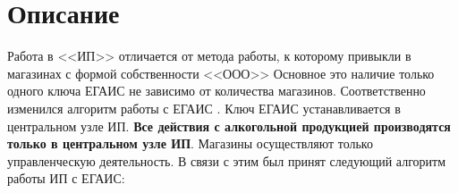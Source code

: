 \section{Описание}

Работа в <<ИП>> отличается от метода работы, к которому привыкли в магазинах с формой собственности <<ООО>>
Основное это наличие только одного ключа ЕГАИС не зависимо от количества магазинов. Соответственно изменился алгоритм работы с ЕГАИС . Ключ ЕГАИС устанавливается в центральном узле ИП. \textbf{Все действия с алкогольной продукцией производятся только в центральном узле ИП}. Магазины осуществляют только управленческую деятельность. В связи с этим  был принят следующий алгоритм работы ИП с ЕГАИС:
